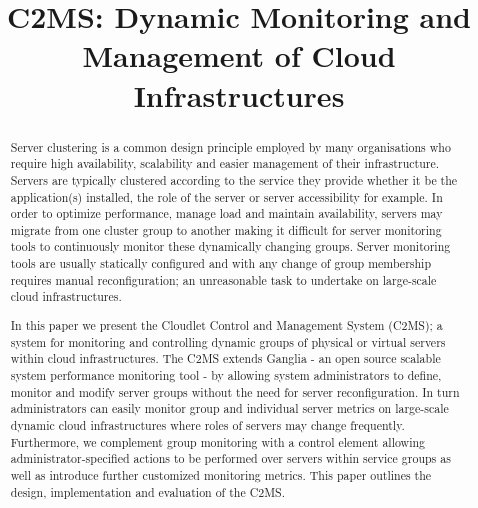 \documentclass[10pt, conference, compsocconf]{IEEEtran}
\begin{document}
\title{C2MS: Dynamic Monitoring and Management of Cloud Infrastructures}







\author{
}

\maketitle
\begin{abstract}
Server clustering is a common design principle employed by many organisations who require high availability, scalability and easier management of their infrastructure. Servers are typically clustered according to the service they provide whether it be the application(s) installed, the role of the server or server accessibility for example. In order to optimize performance, manage load and maintain availability, servers may migrate from one cluster group to another making it difficult for server monitoring tools to continuously monitor these dynamically changing groups. Server monitoring tools are usually statically configured and with any change of group membership requires manual reconfiguration; an unreasonable task to undertake on large-scale cloud infrastructures.

In this paper we present the Cloudlet Control and Management System (C2MS); a system for monitoring and controlling dynamic groups of physical or virtual servers within cloud infrastructures. The C2MS extends Ganglia - an open source scalable system performance monitoring tool - by allowing system administrators to define, monitor and modify server groups without the need for server reconfiguration. In turn administrators can easily monitor group and individual server metrics on large-scale dynamic cloud infrastructures where roles of servers may change frequently. Furthermore, we complement group monitoring with a control element allowing administrator-specified actions to be performed over servers within service groups as well as introduce further customized monitoring metrics. This paper outlines the design, implementation and evaluation of the C2MS. 

\end{abstract}
\end{document}
